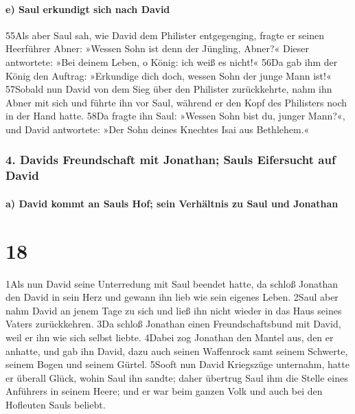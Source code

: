 \hypertarget{e-saul-erkundigt-sich-nach-david}{%
\paragraph{e) Saul erkundigt sich nach
David}\label{e-saul-erkundigt-sich-nach-david}}

55Als aber Saul sah, wie David dem Philister entgegenging, fragte er
seinen Heerführer Abner: »Wessen Sohn ist denn der Jüngling, Abner?«
Dieser antwortete: »Bei deinem Leben, o König: ich weiß es nicht!« 56Da
gab ihm der König den Auftrag: »Erkundige dich doch, wessen Sohn der
junge Mann ist!« 57Sobald nun David von dem Sieg über den Philister
zurückkehrte, nahm ihn Abner mit sich und führte ihn vor Saul, während
er den Kopf des Philisters noch in der Hand hatte. 58Da fragte ihn Saul:
»Wessen Sohn bist du, junger Mann?«, und David antwortete: »Der Sohn
deines Knechtes Isai aus Bethlehem.«

\hypertarget{davids-freundschaft-mit-jonathan-sauls-eifersucht-auf-david}{%
\subsubsection{4. Davids Freundschaft mit Jonathan; Sauls Eifersucht auf
David}\label{davids-freundschaft-mit-jonathan-sauls-eifersucht-auf-david}}

\hypertarget{a-david-kommt-an-sauls-hof-sein-verhuxe4ltnis-zu-saul-und-jonathan}{%
\paragraph{a) David kommt an Sauls Hof; sein Verhältnis zu Saul und
Jonathan}\label{a-david-kommt-an-sauls-hof-sein-verhuxe4ltnis-zu-saul-und-jonathan}}

\hypertarget{section-17}{%
\section{18}\label{section-17}}

1Als nun David seine Unterredung mit Saul beendet hatte, da schloß
Jonathan den David in sein Herz und gewann ihn lieb wie sein eigenes
Leben. 2Saul aber nahm David an jenem Tage zu sich und ließ ihn nicht
wieder in das Haus seines Vaters zurückkehren. 3Da schloß Jonathan einen
Freundschaftsbund mit David, weil er ihn wie sich selbst liebte. 4Dabei
zog Jonathan den Mantel aus, den er anhatte, und gab ihn David, dazu
auch seinen Waffenrock samt seinem Schwerte, seinem Bogen und seinem
Gürtel. 5Sooft nun David Kriegszüge unternahm, hatte er überall Glück,
wohin Saul ihn sandte; daher übertrug Saul ihm die Stelle eines
Anführers in seinem Heere; und er war beim ganzen Volk und auch bei den
Hofleuten Sauls beliebt.

